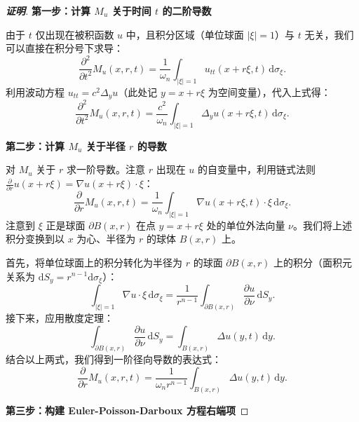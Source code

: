 \documentclass[12pt,a4paper]{ctexart}
\begin{document}
	\begin{proof}[\textbf{证明}]
		\textbf{第一步：计算 $M_u$ 关于时间 $t$ 的二阶导数}
		
		由于 $t$ 仅出现在被积函数 $u$ 中，且积分区域（单位球面 $|\xi|=1$）与 $t$ 无关，我们可以直接在积分号下求导：
		\[
		\frac{\partial^2}{\partial t^2} M_u(x, r, t) = \frac{1}{\omega_n} \int_{|\xi|=1} u_{tt}(x + r\xi, t) \, \mathrm{d}\sigma_\xi.
		\]
		利用波动方程 $u_{tt} = c^2 \Delta_y u$（此处记 $y = x+r\xi$ 为空间变量），代入上式得：
		\begin{equation} \label{eq:mut_laplacian}
			\frac{\partial^2}{\partial t^2} M_u(x, r, t) = \frac{c^2}{\omega_n} \int_{|\xi|=1} \Delta_y u(x + r\xi, t) \, \mathrm{d}\sigma_\xi.
		\end{equation}
		
		\textbf{第二步：计算 $M_u$ 关于半径 $r$ 的导数}
		
		对 $M_u$ 关于 $r$ 求一阶导数。注意 $r$ 出现在 $u$ 的自变量中，利用链式法则 $\frac{\partial}{\partial r} u(x+r\xi) = \nabla u(x+r\xi) \cdot \xi$：
		\[
		\frac{\partial}{\partial r} M_u(x, r, t) = \frac{1}{\omega_n} \int_{|\xi|=1} \nabla u(x + r\xi, t) \cdot \xi \, \mathrm{d}\sigma_\xi.
		\]
		注意到 $\xi$ 正是球面 $\partial B(x,r)$ 在点 $y=x+r\xi$ 处的单位外法向量 $\nu$。我们将上述积分变换到以 $x$ 为心、半径为 $r$ 的球体 $B(x,r)$ 上。
		
		首先，将单位球面上的积分转化为半径为 $r$ 的球面 $\partial B(x,r)$ 上的积分（面积元关系为 $\mathrm{d}S_y = r^{n-1}\mathrm{d}\sigma_\xi$）：
		\[
		\int_{|\xi|=1} \nabla u \cdot \xi \, \mathrm{d}\sigma_\xi = \frac{1}{r^{n-1}} \int_{\partial B(x,r)} \frac{\partial u}{\partial \nu} \, \mathrm{d}S_y.
		\]
		接下来，应用散度定理：
		\[
		\int_{\partial B(x,r)} \frac{\partial u}{\partial \nu} \, \mathrm{d}S_y = \int_{B(x,r)} \Delta u(y, t) \, \mathrm{d}y.
		\]
		结合以上两式，我们得到一阶径向导数的表达式：
		\begin{equation} \label{eq:mur_first}
			\frac{\partial}{\partial r} M_u(x, r, t) = \frac{1}{\omega_n r^{n-1}} \int_{B(x,r)} \Delta u(y, t) \, \mathrm{d}y.
		\end{equation}
		
		\textbf{第三步：构建 Euler-Poisson-Darboux 方程右端项}
		

\end{proof}
\end{document}
